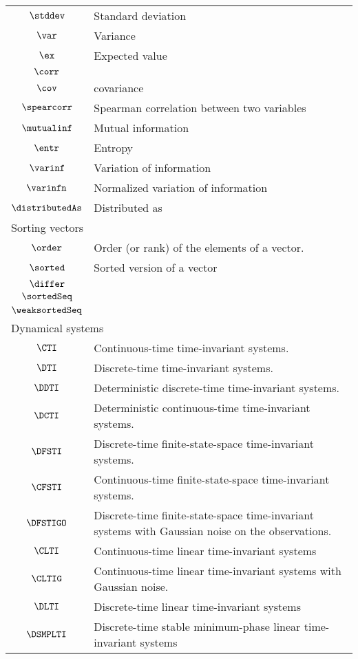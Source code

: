 \begin{longtable}{cl}
 \hline
$\stddev$ &  Standard deviation\\ 
 $\var$ &  Variance\\ 
 $\ex$ &  Expected value\\ 
 $\corr$ & \\ 
 $\cov$ &  covariance\\ 
 $\spearcorr$ &  Spearman correlation between two variables\\ 
 $\mutualinf$ &  Mutual information\\ 
 $\entr$ &  Entropy\\ 
 $\varinf$ &  Variation of information\\ 
 $\varinfn$ &  Normalized variation of information\\ 
 $\distributedAs$ &  Distributed as\\ 
 \multicolumn{2}{l}{Sorting vectors}\\ 
 \hline
$\order$ &  Order (or rank) of the elements of a vector.\\ 
 $\sorted$ &  Sorted version of a vector\\ 
 $\differ$ & \\ 
 $\sortedSeq$ & \\ 
 $\weaksortedSeq$ & \\ 
 \multicolumn{2}{l}{Dynamical systems}\\ 
 \hline
$\CTI$ &  Continuous-time time-invariant systems.\\ 
 $\DTI$ &  Discrete-time time-invariant systems.\\ 
 $\DDTI$ &  Deterministic discrete-time time-invariant systems.\\ 
 $\DCTI$ &  Deterministic continuous-time time-invariant systems.\\ 
 $\DFSTI$ &  Discrete-time finite-state-space time-invariant systems.\\ 
 $\CFSTI$ &  Continuous-time finite-state-space time-invariant systems.\\ 
 $\DFSTIGO$ &  Discrete-time finite-state-space time-invariant systems with Gaussian noise on the observations.\\ 
 $\CLTI$ &  Continuous-time linear time-invariant systems\\ 
 $\CLTIG$ &  Continuous-time linear time-invariant systems with Gaussian noise.\\ 
 $\DLTI$ &  Discrete-time linear time-invariant systems\\ 
 $\DSMPLTI$ &  Discrete-time stable minimum-phase linear time-invariant systems\\ 

\end{longtable}
